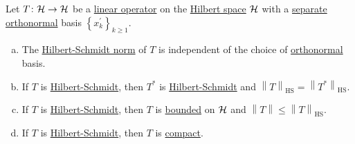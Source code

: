 \begin{proposition}
	Let \(T\colon \mathcal{\MakeUppercase{h}} \to \mathcal{\MakeUppercase{h}} \) be a \hyperref[def:linear-op]{linear operator} on the \hyperref[def:Hilbert-space]{Hilbert space} \(\mathcal{\MakeUppercase{h}} \) with a \hyperref[def:separable]{separate} \hyperref[def:orthonormal-system]{orthonormal} basis \(\left\{ x^\prime _k \right\}_{k\geq 1} \).
	\begin{enumerate}[(a)]
		\item The \hyperref[def:Hilbert-Schmidt-norm]{Hilbert-Schmidt norm} of \(T\) is independent of the choice of \hyperref[def:orthonormal-system]{orthonormal} basis.
		\item If \(T\) is \hyperref[def:Hilbert-Schmidt-op]{Hilbert-Schmidt}, then \(T^{\ast} \) is \hyperref[def:Hilbert-Schmidt-op]{Hilbert-Schmidt} and \(\left\lVert T\right\rVert _{\mathrm{HS} } = \left\lVert T^{\ast} \right\rVert _{\mathrm{HS} } \).
		\item If \(T\) is \hyperref[def:Hilbert-Schmidt-op]{Hilbert-Schmidt}, then \(T\) is \hyperref[def:bounded-linear-op]{bounded} on \(\mathcal{\MakeUppercase{h}} \) and \(\left\lVert T\right\rVert \leq \left\lVert T\right\rVert _{\mathrm{HS} }\).
		\item If \(T\) is \hyperref[def:Hilbert-Schmidt-op]{Hilbert-Schmidt}, then \(T\) is \hyperref[def:compact-op]{compact}.
	\end{enumerate}
\end{proposition}
